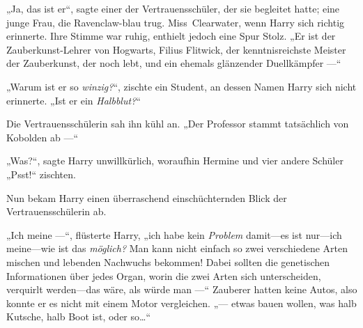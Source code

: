„Ja, das ist er“, sagte einer der Vertrauensschüler, der sie begleitet hatte; eine junge Frau, die Ravenclaw-blau trug. Miss~Clearwater, wenn Harry sich richtig erinnerte. Ihre Stimme war ruhig, enthielt jedoch eine Spur Stolz. „Er ist der Zauberkunst-Lehrer von Hogwarts, Filius Flitwick, der kenntnisreichste Meister der Zauberkunst, der noch lebt, und ein ehemals glänzender Duellkämpfer —“




„Warum ist er so \emph{winzig?}“, zischte ein Student, an dessen Namen Harry sich nicht erinnerte. „Ist er ein \emph{Halbblut?}“

Die Vertrauensschülerin sah ihn kühl an. „Der Professor stammt tatsächlich von Kobolden ab —“

„Was?“, sagte Harry unwillkürlich, woraufhin Hermine und vier andere Schüler „Psst!“ zischten.

Nun bekam Harry einen überraschend einschüchternden Blick der Vertrauensschülerin ab.

„Ich meine —“, flüsterte Harry, „ich habe kein \emph{Problem} damit—es ist nur—ich meine—wie ist das \emph{möglich?} Man kann nicht einfach so zwei verschiedene Arten mischen und lebenden Nachwuchs bekommen! Dabei sollten die genetischen Informationen über jedes Organ, worin die zwei Arten sich unterscheiden, verquirlt werden—das wäre, als würde man —“ Zauberer hatten keine Autos, also konnte er es nicht mit einem Motor vergleichen. „— etwas bauen wollen, was halb Kutsche, halb Boot ist, oder so…“

